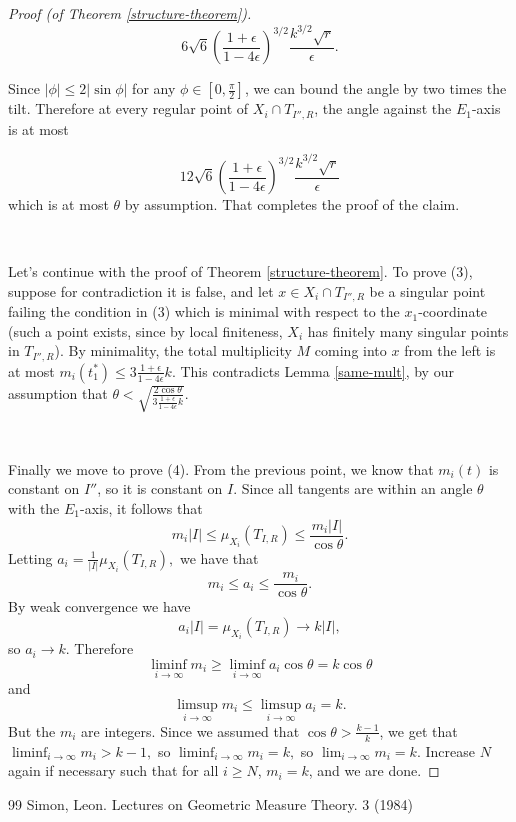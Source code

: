 \documentclass[10pt,a4paper]{amsart}
\begin{document}
\begin{proof}[Proof (of Theorem \ref{structure-theorem})]
\[6\sqrt{6} \left(\frac{1+\epsilon}{1-4\epsilon}\right)^{3/2}  \frac{k^{3/2}\sqrt{r}}{\epsilon}. \]

Since $|\phi| \leq 2|\sin \phi|$ for any $\phi \in [0,\frac{\pi}{2}]$, we can bound the angle by two times the tilt. Therefore at every regular point of $X_i \cap T_{I'',R}$, the angle against the $E_1$-axis is at most

\[12\sqrt{6} \left(\frac{1+\epsilon}{1-4\epsilon}\right)^{3/2}  \frac{k^{3/2}\sqrt{r}}{\epsilon} \]
which is at most $\theta$ by assumption. That completes the proof of the claim.

\

Let's continue with the proof of Theorem \ref{structure-theorem}. To prove (3), suppose for contradiction it is false, and let $x \in X_i \cap T_{I'',R}$ be a singular point failing the condition in (3) which is minimal with respect to the $x_1$-coordinate (such a point exists, since by local finiteness, $X_i$ has finitely many singular points in $T_{I'',R}$). By minimality, the total multiplicity $M$ coming into $x$ from the left is at most $m_i(t_1^*) \leq 3\frac{1+\epsilon}{1-4\epsilon}k$. This contradicts Lemma \ref{same-mult}, by our assumption that $\theta < \sqrt{\frac{2\cos \theta}{3\frac{1+\epsilon}{1-4\epsilon}k}}$.

\ 

Finally we move to prove (4). From the previous point, we know that $m_i(t)$ is constant on $I''$, so it is constant on $I$. Since all tangents are within an angle $\theta$ with the $E_1$-axis, it follows that
\[m_i |I| \leq \mu_{X_i}(T_{I,R}) \leq \frac{m_i|I|}{\cos \theta}.\]
Letting $a_i = \frac{1}{|I|}\mu_{X_i}(T_{I,R}),$
we have that
\[m_i \leq a_i \leq \frac{m_i}{\cos \theta}.\]
 By weak convergence we have
\[a_i|I| = \mu_{X_i}(T_{I,R}) \to k|I|,\]
so $a_i \to k$. 
Therefore 
\[\liminf_{i \to \infty}m_i \geq \liminf_{i \to \infty} a_i \cos \theta  = k \cos \theta \]
and
\[\limsup_{i \to \infty}m_i \leq \limsup_{i \to \infty} a_i = k.\]
But the $m_i$ are integers. Since we assumed that $\cos \theta > \frac{k-1}{k}$, we get that 
$\liminf_{i \to \infty} m_i > k-1,$
so
$\liminf_{i \to \infty} m_i = k,$ so $\lim_{i \to \infty}m_i = k.$ Increase $N$ again if necessary such that for all $i \geq N$, $m_i = k$, and we are done.
\end{proof}


\begin{thebibliography}{99}
 Simon, Leon. Lectures on Geometric Measure Theory. 3 (1984)
\end{thebibliography}
\end{document}

